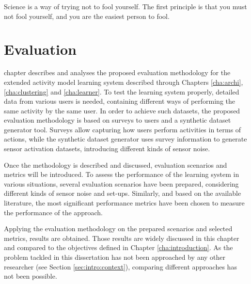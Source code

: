 

\begin{savequote}[50mm]
Science is a way of trying not to fool yourself. The first principle is that you must not fool yourself, and you are the easiest person to fool.
\end{savequote}


\chapter{Evaluation}
\label{cha:evaluation}

\ifpdf
    \graphicspath{{6_evaluation/figures/PDF/}{6_evaluation/figures/PNG/}{6_evaluation/figures/}}
\else
    \graphicspath{{6_evaluation/figures/EPS/}{6_evaluation/figures/}}
\fi

 chapter describes and analyses the proposed evaluation methodology for the extended activity model learning system described through Chapters \ref{cha:archi}, \ref{cha:clustering} and \ref{cha:learner}. To test the learning system properly, detailed data from various users is needed, containing different ways of performing the same activity by the same user. In order to achieve such datasets, the proposed evaluation methodology is based on surveys to users and a synthetic dataset generator tool. Surveys allow capturing how users perform activities in terms of actions, while the synthetic dataset generator uses survey information to generate sensor activation datasets, introducing different kinds of sensor noise. 

Once the methodology is described and discussed, evaluation scenarios and metrics will be introduced. To assess the performance of the learning system in various situations, several evaluation scenarios have been prepared, considering different kinds of sensor noise and set-ups. Similarly, and based on the available literature, the most significant performance metrics have been chosen to measure the performance of the approach.

Applying the evaluation methodology on the prepared scenarios and selected metrics, results are obtained. Those results are widely discussed in this chapter and compared to the objectives defined in Chapter \ref{cha:introduction}. As the problem tackled in this dissertation has not been approached by any other researcher (see Section \ref{sec:intro:context}), comparing different approaches has not been possible.


